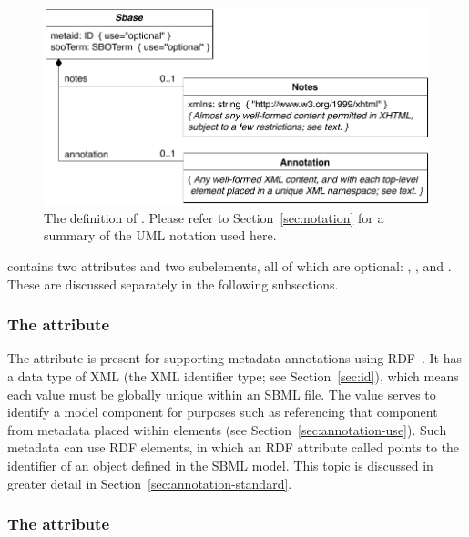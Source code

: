 \begin{figure}[hbt]
  \centering
  \small
  \includegraphics[scale=0.8]{figs/sbase-uml}
  \caption{The definition of \SBase.  Please refer to
    Section~\protect\ref{sec:notation} for a summary of the UML
    notation used here.}
  \label{fig:sbase}
\end{figure}

\SBase contains two attributes and two subelements, all of which are optional:
, ,  and
.  These are discussed separately in the
following subsections.


\subsubsection{The  attribute}
\label{sec:metaid}

The  attribute is present for supporting metadata
annotations using RDF~\citep[Resource Description
Format;][]{lassila:1999}.  It has a data type of XML 
(the XML identifier type; see Section~\ref{sec:id}), which means each  value
must be globally unique within an SBML file.  The 
value serves to identify a model component for purposes such as
referencing that component from metadata placed within
 elements (see
Section~\ref{sec:annotation-use}).  Such metadata can use RDF
 elements, in which an RDF attribute called
 points to the  identifier of an
object defined in the SBML model.  This topic is discussed in
greater detail in Section~\ref{sec:annotation-standard}.


\subsubsection{The  attribute}
\label{sec:sbase-sboterm}

